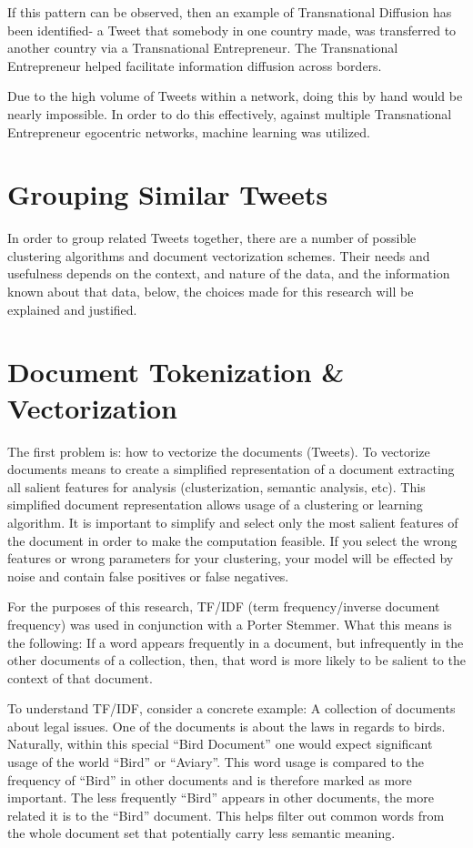 If this pattern can be observed, then an example of Transnational
Diffusion has been identified- a Tweet that somebody in one country
made, was transferred to another country via a Transnational
Entrepreneur. The Transnational Entrepreneur helped facilitate
information diffusion across borders.

Due to the high volume of Tweets within a network, doing this by hand
would be nearly impossible. In order to do this effectively, against
multiple Transnational Entrepreneur egocentric networks, machine
learning was utilized.

\section{Grouping Similar Tweets}
In order to group related Tweets together, there are a number of
possible clustering algorithms and document vectorization
schemes. Their needs and usefulness depends on the context, and nature
of the data, and the information known about that data, below, the
choices made for this research will be explained and justified.

\section{Document Tokenization \& Vectorization}
The first problem is: how to vectorize the documents (Tweets). To
vectorize documents means to create a simplified representation of a
document extracting all salient features for analysis (clusterization,
semantic analysis, etc). This simplified document representation
allows usage of a clustering or learning algorithm. It is important to
simplify and select only the most salient features of the document in
order to make the computation feasible. If you select the wrong
features or wrong parameters for your clustering, your model will be
effected by noise and contain false positives or false negatives.

For the purposes of this research, TF/IDF (term frequency/inverse
document frequency) was used in conjunction with a Porter
Stemmer. What this means is the following: If a word appears
frequently in a document, but infrequently in the other documents of a
collection, then, that word is more likely to be salient to the
context of that document.

To understand TF/IDF, consider a concrete example: A collection of
documents about legal issues. One of the documents is about the laws
in regards to birds. Naturally, within this special ``Bird Document''
one would expect significant usage of the world ``Bird'' or
``Aviary''. This word usage is compared to the frequency of ``Bird''
in other documents and is therefore marked as more important. The less
frequently ``Bird'' appears in other documents, the more related it is
to the ``Bird'' document. This helps filter out common words from the
whole document set that potentially carry less semantic meaning.

